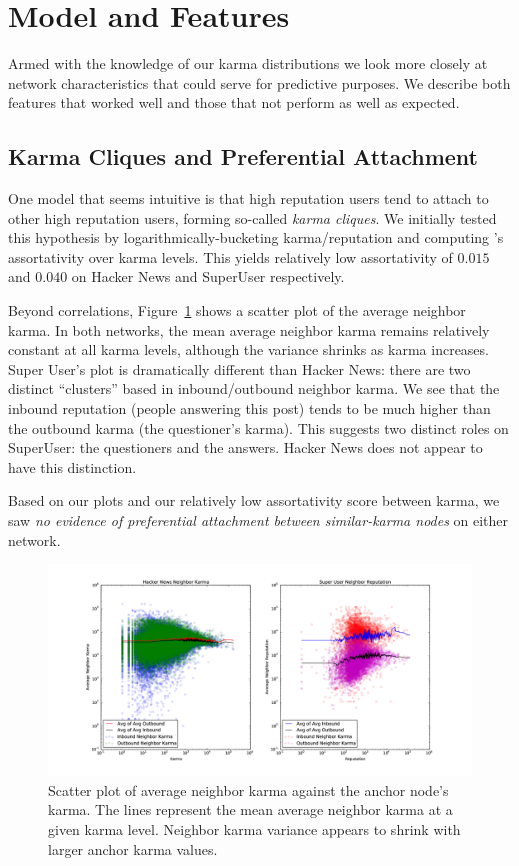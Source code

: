 \documentclass[11pt]{article}
\begin{document}
\section{Model and Features}
\label{sec:model}

Armed with the knowledge of our karma distributions we look more closely at network
characteristics that could serve for predictive purposes. We describe
both features that worked well and those that not perform as well 
as expected.

\subsection{Karma Cliques and Preferential Attachment}
\label{sec:karma_cliques}

One model that seems intuitive is that high reputation users tend to attach to
other high reputation users, forming so-called \textit{karma cliques}. We
initially tested this hypothesis by logarithmically-bucketing karma/reputation
and computing \citet{newman2003mixing}'s assortativity over karma levels. This
yields relatively low assortativity of $0.015$ and $0.040$ on Hacker News and
SuperUser respectively.

Beyond correlations, Figure~\ref{fig:karma_cliques} shows a scatter plot of the
average neighbor karma. In both networks, the mean average neighbor
karma remains relatively constant at all karma levels, although the variance
shrinks as karma increases.  Super User's plot is dramatically different than
Hacker News: there are two distinct ``clusters'' based in inbound/outbound neighbor
karma. We see that the inbound reputation (people answering this
post) tends to be much higher than the outbound karma (the questioner's karma).
This suggests two distinct roles on SuperUser: the questioners and the answers.
Hacker News does not appear to have this distinction.

Based on our plots and our relatively low assortativity score between karma, we
saw \textit{no evidence of preferential attachment between similar-karma nodes}
on either network.

\begin{figure}[t]
\centering
\includegraphics[width=\linewidth]{karma_cliques-png}
\caption{Scatter plot of average neighbor karma against the anchor node's karma. 
The lines represent the mean average neighbor karma at a given karma level.
Neighbor karma variance appears to shrink with larger anchor karma values.}
\label{fig:karma_cliques}
\end{figure}
\end{document}
